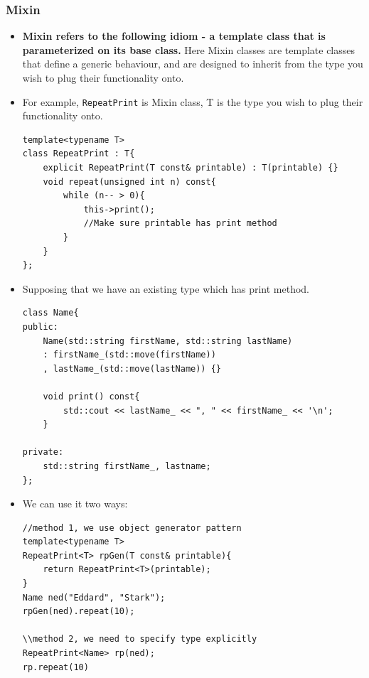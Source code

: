 \documentclass[a4paper,11pt,twoside]{book}
\begin{document}
\subsubsection{Mixin}
\begin{itemize}
	
	\item \textbf{Mixin refers to the following idiom - a template class that is parameterized on its base class.} Here Mixin classes are template classes that define a generic behaviour, and are designed to inherit from the type you wish to plug their functionality onto.
	
	\item For example, \texttt{RepeatPrint} is Mixin class, T is the type you wish to plug their functionality onto.
\begin{lstlisting}[numbers=none]
template<typename T>
class RepeatPrint : T{
	explicit RepeatPrint(T const& printable) : T(printable) {}
	void repeat(unsigned int n) const{
		while (n-- > 0){
			this->print(); 
			//Make sure printable has print method
		}
	}
};
\end{lstlisting}
	
	\item Supposing that we have an existing type which has print method.
\begin{lstlisting}[numbers=none]
class Name{
public:
	Name(std::string firstName, std::string lastName)
	: firstName_(std::move(firstName))
	, lastName_(std::move(lastName)) {}
	
	void print() const{
		std::cout << lastName_ << ", " << firstName_ << '\n';
	}
	
private:
	std::string firstName_, lastname;
};
\end{lstlisting}
	
	\item We can use it two ways:
\begin{lstlisting}[numbers=none]
//method 1, we use object generator pattern
template<typename T>
RepeatPrint<T> rpGen(T const& printable){
	return RepeatPrint<T>(printable);
}
Name ned("Eddard", "Stark");    
rpGen(ned).repeat(10);

\\method 2, we need to specify type explicitly
RepeatPrint<Name> rp(ned);
rp.repeat(10)
\end{lstlisting}

\end{itemize}
\end{document}
